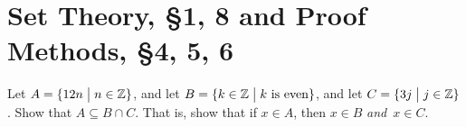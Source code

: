 
%

\section{{Set Theory,  \framebox\S 1, 8} and Proof Methods, \framebox\S 4,  5,  6}

%
\thispagestyle{fancy}

\begin{enumerate}
  \Problem Let $A = \{12 n \;\big{|}\; n \in \mathbb{Z}\}$, and let $B =
  \{k\in \mathbb{Z}\;\big{|}\; k\ \text{is even}\}$, and let $C= \{3j
  \;\big{|}\; j \in \mathbb{Z}\}$.  Show that $A \subseteq B\cap C$.  That is,
  show that if $x\in A$, then $x\in B$ \emph{and}\ $x\in C$.
  \vfill

\end{enumerate}

\newpage

